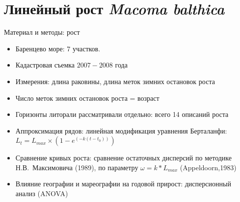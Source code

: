 \documentclass{beamer}
\begin{document}
		\section[Линейный рост]{Линейный рост {\it Macoma balthica}}
\begin{frame}{Материал и методы: рост}
\begin{itemize}
	\item Баренцево море: 7 участков.
	\item Кадастровая съемка $2007 - 2008$ года
	\item Измерения: длина раковины, длина меток зимних остановок роста
	\item Число меток зимних остановок роста = возраст
	\item Горизонты литорали рассматривали отдельно: всего 14 описаний роста
	\item Аппроксимация рядов: линейная модификация уравнения Берталанфи: $L_{t} = L_{max} \times (1 - e^{(-k(t - t_{0}))})$
	\item Сравнение кривых роста: сравнение остаточных дисперсий по методике Н.В.~Максимовича (1989), по параметру $\omega = k * L_{max}$ (Appeldoorn,1983)
	\item Влияние географии и мареографии на годовой прирост: дисперсионный анализ (ANOVA)
\end{itemize}
\end{frame}
\end{document}

